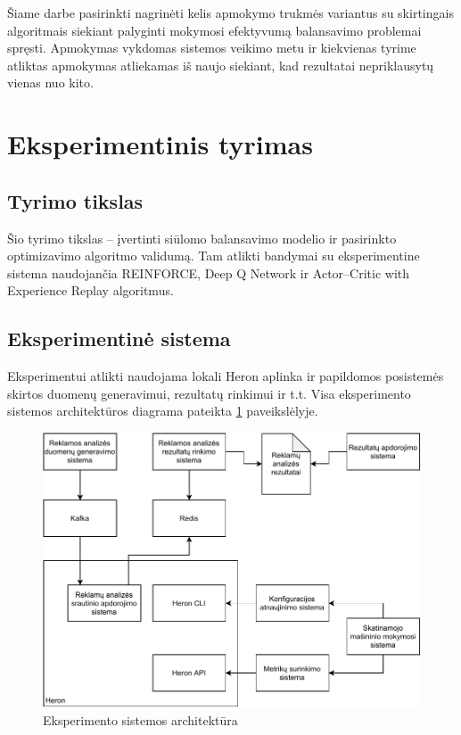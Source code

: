 \documentclass{VUMIFPSbakalaurinis}
\begin{document}
Šiame darbe pasirinkti nagrinėti kelis apmokymo trukmės variantus su skirtingais algoritmais siekiant palyginti mokymosi efektyvumą balansavimo problemai spręsti. Apmokymas vykdomas sistemos veikimo metu ir kiekvienas tyrime atliktas apmokymas atliekamas iš naujo siekiant, kad rezultatai nepriklausytų vienas nuo kito.

\section{Eksperimentinis tyrimas}

\subsection{Tyrimo tikslas}

Šio tyrimo tikslas – įvertinti siūlomo balansavimo modelio ir pasirinkto optimizavimo algoritmo validumą. Tam atlikti bandymai su eksperimentine sistema naudojančia REINFORCE, Deep Q Network ir Actor–Critic with Experience Replay algoritmus.

\subsection{Eksperimentinė sistema}

Eksperimentui atlikti naudojama lokali Heron aplinka ir papildomos posistemės skirtos duomenų generavimui, rezultatų rinkimui ir t.t. Visa eksperimento sistemos architektūros diagrama pateikta \ref{experiment} paveikslėlyje.

\begin{figure}[H]
    \includegraphics[width=14cm]{img/Experiment.pdf}
    \caption{Eksperimento sistemos architektūra}
    \label{experiment}
\end{figure} 
\end{document}
